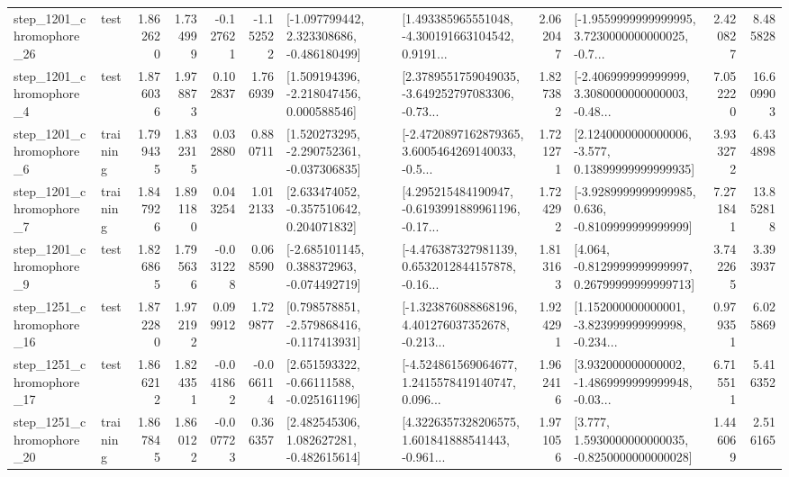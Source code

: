 \begin{tabular}{llrrrrllrlrr}
 step\_1201\_chromophore\_26 &      test &      1.862620 &    1.734999 &     -0.127621 & -1.152522 &   [-1.097799442, 2.323308686, -0.486180499] &  [1.493385965551048, -4.300191663104542, 0.9191... &       2.062047 &  [-1.9559999999999995, 3.7230000000000025, -0.7... &            2.420827 &          8.485828 \\
  step\_1201\_chromophore\_4 &      test &      1.876036 &    1.978873 &      0.102837 &  1.766939 &    [1.509194396, -2.218047456, 0.000588546] &  [2.3789551759049035, -3.649252797083306, -0.73... &       1.827382 &  [-2.406999999999999, 3.3080000000000003, -0.48... &            7.052220 &         16.609903 \\
  step\_1201\_chromophore\_6 &  training &      1.799435 &    1.832315 &      0.032880 &  0.880711 &   [1.520273295, -2.290752361, -0.037306835] &  [-2.4720897162879365, 3.6005464269140033, -0.5... &       1.721271 &  [2.1240000000000006, -3.577, 0.13899999999999935] &            3.933272 &          6.434898 \\
  step\_1201\_chromophore\_7 &  training &      1.847926 &    1.891180 &      0.043254 &  1.012133 &    [2.633474052, -0.357510642, 0.204071832] &  [4.295215484190947, -0.6193991889961196, -0.17... &       1.724292 &  [-3.9289999999999985, 0.636, -0.8109999999999999] &            7.271841 &         13.852818 \\
  step\_1201\_chromophore\_9 &      test &      1.826865 &    1.795636 &     -0.031228 &  0.068590 &   [-2.685101145, 0.388372963, -0.074492719] &  [-4.476387327981139, 0.6532012844157878, -0.16... &       1.813163 &  [4.064, -0.8129999999999997, 0.26799999999999713] &            3.742265 &          3.393937 \\
 step\_1251\_chromophore\_16 &      test &      1.872280 &    1.972192 &      0.099912 &  1.729877 &   [0.798578851, -2.579868416, -0.117413931] &  [-1.323876088868196, 4.401276037352678, -0.213... &       1.924291 &  [1.152000000000001, -3.823999999999998, -0.234... &            0.979351 &          6.025869 \\
 step\_1251\_chromophore\_17 &      test &      1.866212 &    1.824351 &     -0.041862 & -0.066114 &    [2.651593322, -0.66111588, -0.025161196] &  [-4.524861569064677, 1.2415578419140747, 0.096... &       1.962416 &  [3.932000000000002, -1.4869999999999948, -0.03... &            6.715511 &          5.416352 \\
 step\_1251\_chromophore\_20 &  training &      1.867845 &    1.860122 &     -0.007723 &  0.366357 &    [2.482545306, 1.082627281, -0.482615614] &  [4.3226357328206575, 1.601841888541443, -0.961... &       1.971056 &   [3.777, 1.5930000000000035, -0.8250000000000028] &            1.446069 &          2.516165 \\

\end{tabular}
